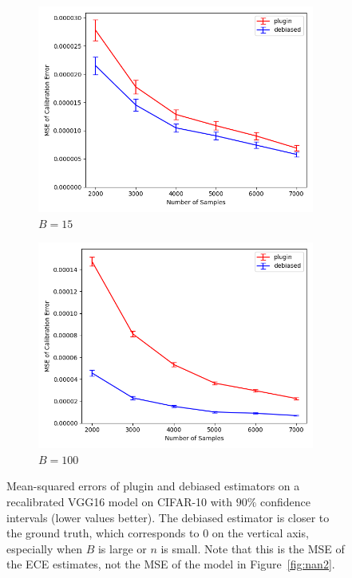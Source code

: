 \begin{figure}
  \centering
  \centering
     \begin{subfigure}[b]{0.45\textwidth}
         \centering
         \includegraphics[width=\textwidth]{images/cifar_scaling_ece_curve_15.png}
         \caption{$B = 15$
         }
     \end{subfigure}
     \hfill
     \begin{subfigure}[b]{0.45\textwidth}
         \centering
         \includegraphics[width=\textwidth]{images/cifar_scaling_ece_curve_100.png}
         \caption{$B = 100$
         }
     \end{subfigure}
  \caption{
    Mean-squared errors of plugin and debiased estimators on a recalibrated VGG16 model on CIFAR-10 with $90\%$ confidence intervals (lower values better). The debiased estimator is closer to the ground truth, which corresponds to $0$ on the vertical axis, especially when $B$ is large or $n$ is small.
    Note that this is the MSE of the ECE estimates, not the MSE of the model in Figure~\ref{fig:nan2}.
}
  \label{fig:mse_estimators_cifar_ece_bins}
\end{figure}

